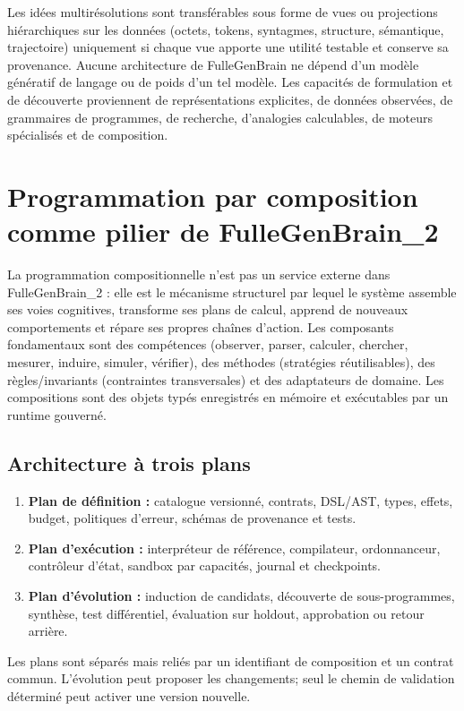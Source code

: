 \documentclass[11pt,a4paper]{article}
\theoremstyle{definition}
\theoremstyle{plain}
\theoremstyle{remark}
\begin{document}
Les idées multirésolutions sont transférables sous forme de vues ou projections hiérarchiques sur les données (octets, tokens, syntagmes, structure, sémantique, trajectoire) uniquement si chaque vue apporte une utilité testable et conserve sa provenance. Aucune architecture de FulleGenBrain ne dépend d'un modèle génératif de langage ou de poids d'un tel modèle. Les capacités de formulation et de découverte proviennent de représentations explicites, de données observées, de grammaires de programmes, de recherche, d'analogies calculables, de moteurs spécialisés et de composition.

\section{Programmation par composition comme pilier de FulleGenBrain\_2}
La programmation compositionnelle n'est pas un service externe dans FulleGenBrain\_2 : elle est le mécanisme structurel par lequel le système assemble ses voies cognitives, transforme ses plans de calcul, apprend de nouveaux comportements et répare ses propres chaînes d'action. Les composants fondamentaux sont des compétences (observer, parser, calculer, chercher, mesurer, induire, simuler, vérifier), des méthodes (stratégies réutilisables), des règles/invariants (contraintes transversales) et des adaptateurs de domaine. Les compositions sont des objets typés enregistrés en mémoire et exécutables par un runtime gouverné.

\subsection{Architecture à trois plans}
\begin{enumerate}
\item \textbf{Plan de définition :} catalogue versionné, contrats, DSL/AST, types, effets, budget, politiques d'erreur, schémas de provenance et tests.
\item \textbf{Plan d'exécution :} interpréteur de référence, compilateur, ordonnanceur, contrôleur d'état, sandbox par capacités, journal et checkpoints.
\item \textbf{Plan d'évolution :} induction de candidats, découverte de sous-programmes, synthèse, test différentiel, évaluation sur holdout, approbation ou retour arrière.
\end{enumerate}
Les plans sont séparés mais reliés par un identifiant de composition et un contrat commun. L'évolution peut proposer les changements; seul le chemin de validation déterminé peut activer une version nouvelle.
\end{document}
